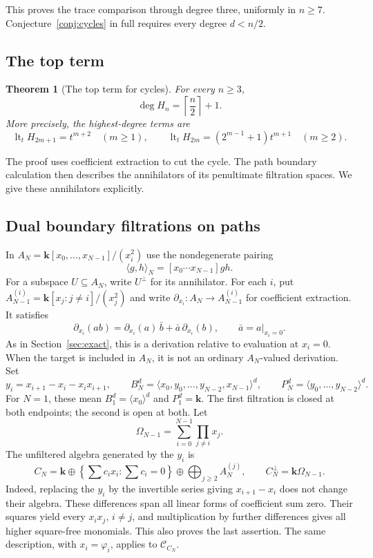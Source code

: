 \documentclass[reqno]{article}
\theoremstyle{plain} %
\newtheorem{theorem}{Theorem}[section]
\theoremstyle{definition}
\theoremstyle{remark}
\newcommand{\K} {\mathbf{k}}
\newcommand {\CC}{\mathscr{C}}
\numberwithin{equation}{section}
\begin{document}
This proves the trace comparison through degree three, uniformly in
$n\ge7$. Conjecture~\ref{conj:cycles} in full requires every degree $d<n/2$.

\subsection{The top term}
\label{sec:cycle-top}

\begin{theorem}[The top term for cycles]\label{thm:cycle-top}
For every $n\ge3$,
\[
\deg H_n=\left\lceil\frac n2\right\rceil+1.
\]
More precisely, the highest-degree terms are
\begin{equation}\label{eq:cycle-top-terms}
\operatorname{lt}_tH_{2m+1}=t^{m+2}\quad(m\ge1),\qquad
\operatorname{lt}_tH_{2m}=(2^{m-1}+1)t^{m+1}\quad(m\ge2).
\end{equation}
\end{theorem}

The proof uses coefficient extraction to cut the cycle. The path
boundary calculation then describes the annihilators of its penultimate
filtration spaces. We give these annihilators explicitly.

\subsection{Dual boundary filtrations on paths}
\label{sec:dual-paths}

In $A_N=\K[x_0,\ldots,x_{N-1}]/(x_i^2)$ use the nondegenerate pairing
\begin{equation}\label{eq:coefficient-pairing}
\langle g,h\rangle_N=[x_0\cdots x_{N-1}]gh.
\end{equation}
For a subspace $U\subseteq A_N$, write $U^\perp$ for its annihilator.
For each $i$, put $A_{N-1}^{(i)}=\K[x_j:j\ne i]/(x_j^2)$ and
write $\partial_{x_i}:A_N\to A_{N-1}^{(i)}$ for coefficient extraction.
It satisfies
\[
 \partial_{x_i}(ab)=\partial_{x_i}(a)\,\bar b+
                  \bar a\,\partial_{x_i}(b),\qquad \bar a=a|_{x_i=0}.
\]
As in Section~\ref{sec:exact}, this is a derivation relative to
evaluation at $x_i=0$. When the target is included in $A_N$, it is not
an ordinary $A_N$-valued derivation. Set
\[
y_i=x_{i+1}-x_i-x_ix_{i+1},\qquad
B_N^d=\langle x_0,y_0,\ldots,y_{N-2},x_{N-1}\rangle^d,\qquad
P_N^d=\langle y_0,\ldots,y_{N-2}\rangle^d.
\]
For $N=1$, these mean $B_1^d=\langle x_0\rangle^d$ and $P_1^d=\K$.
The first filtration is closed at both endpoints; the second is open
at both. Let
\[
\Omega_{N-1}=\sum_{i=0}^{N-1}\prod_{j\ne i}x_j.
\]
The unfiltered algebra generated by the $y_i$ is
\begin{equation}\label{eq:open-path-algebra}
C_N=\K\oplus
\left\{\sum c_ix_i:\sum c_i=0\right\}
\oplus\bigoplus_{j\ge2}A_N^{(j)},
\qquad C_N^\perp=\K\Omega_{N-1}.
\end{equation}
Indeed, replacing the $y_i$ by the invertible series giving
$x_{i+1}-x_i$ does not change their algebra. These differences span all
linear forms of coefficient sum zero. Their squares yield every
$x_ix_j$, $i\ne j$, and multiplication by further differences gives all
higher square-free monomials. This also proves the last assertion.
The same description, with $x_i=\varphi_i$, applies to $\CC_{C_N}$.
\end{document}
